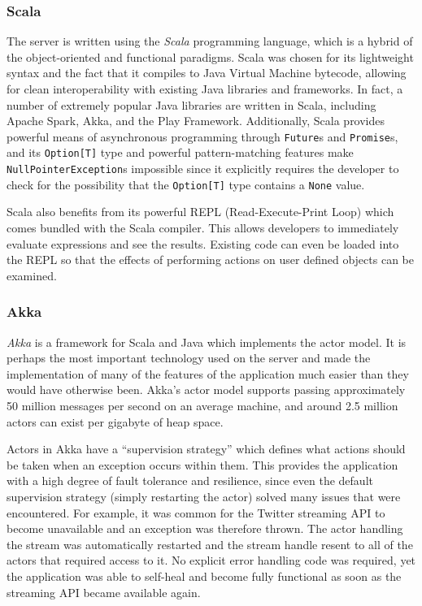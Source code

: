 \documentclass{l4proj}
\newcommand{\code}[1]{\texttt{#1}}
\begin{document}
        \subsubsection{Scala}
        The server is written using the \textit{Scala} programming language, which is a hybrid of the object-oriented and functional paradigms. Scala was chosen for its lightweight syntax and the fact that it compiles to Java Virtual Machine bytecode, allowing for clean interoperability with existing Java libraries and frameworks. In fact, a number of extremely popular Java libraries are written in Scala, including Apache Spark, Akka, and the Play Framework. Additionally, Scala provides powerful means of asynchronous programming through \code{Future}s and \code{Promise}s, and its \code{Option[T]} type and powerful pattern-matching features make \code{NullPointerException}s impossible since it explicitly requires the developer to check for the possibility that the \code{Option[T]} type contains a \code{None} value.
        
Scala also benefits from its powerful REPL (Read-Execute-Print Loop) which comes bundled with the Scala compiler. This allows developers to immediately evaluate expressions and see the results. Existing code can even be loaded into the REPL so that the effects of performing actions on user defined objects can be examined.
        
        \subsubsection{Akka}
        \textit{Akka} is a framework for Scala and Java which implements the actor model. It is perhaps the most important technology used on the server and made the implementation of many of the features of the application much easier than they would have otherwise been. Akka's actor model supports passing approximately 50 million messages per second on an average machine, and around 2.5 million actors can exist per gigabyte of heap space.
        
        Actors in Akka have a “supervision strategy” which defines what actions should be taken when an exception occurs within them. This provides the application with a high degree of fault tolerance and resilience, since even the default supervision strategy (simply restarting the actor) solved many issues that were encountered. For example, it was common for the Twitter streaming API to become unavailable and an exception was therefore thrown. The actor handling the stream was automatically restarted and the stream handle resent to all of the actors that required access to it. No explicit error handling code was required, yet the application was able to self-heal and become fully functional as soon as the streaming API became available again.
        
\end{document}
